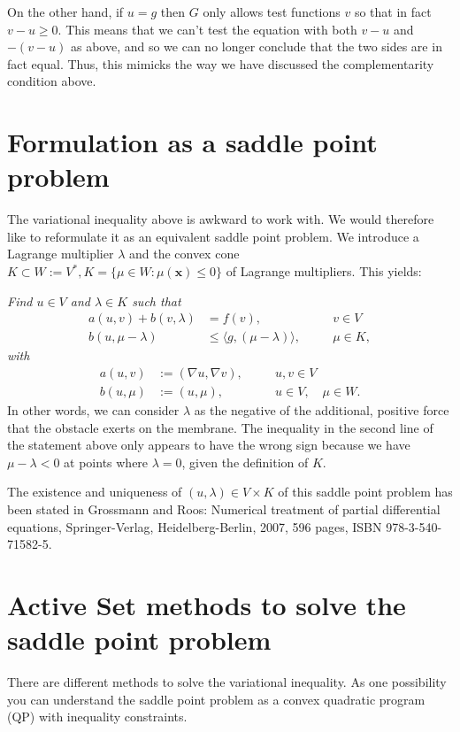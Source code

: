 \documentclass{article}
\begin{document}
On the other hand, if $u=g$ then $G$ only allows test functions $v$ so that in fact
$v-u\ge 0$. This means that we can't test the equation with both $v-u$ and
$-(v-u)$ as above, and so we can no longer conclude that the two sides are in
fact equal. Thus, this mimicks the way we have discussed the complementarity
condition above.

\section{Formulation as a saddle point problem}

The variational inequality above is awkward to work with. We would therefore
like to reformulate it as an equivalent saddle point problem. We introduce a
Lagrange multiplier $\lambda$ and the convex cone $K\subset W:=V^*, K=\{\mu\in
W: \mu(\mathbf x)\le 0\}$ of
Lagrange multipliers. This yields:

\textit{Find $u\in V$ and $\lambda\in K$ such that}
\begin{align*}
 a(u,v) + b(v,\lambda) &= f(v),\quad &&v\in V\\
 b(u,\mu - \lambda) &\leq \langle g,(\mu - \lambda)\rangle,\quad&&\mu\in K,
\end{align*}
\textit{with}
\begin{align*}
 a(u,v) &:= \left(\nabla u, \nabla v\right),\quad &&u,v\in V\\
 b(u,\mu) &:= (u,\mu),\quad &&u\in V,\quad\mu\in W.
\end{align*}
In other words, we can consider $\lambda$ as the negative of the additional, positive force that the
obstacle exerts on the membrane. The inequality in the second line of the
statement above only appears to have the wrong sign because we have
$\mu-\lambda<0$ at points where $\lambda=0$, given the definition of $K$.

The existence and uniqueness of $(u,\lambda)\in V\times K$ of this saddle
point problem has been stated in Grossmann and Roos: Numerical treatment of
partial differential equations, Springer-Verlag, Heidelberg-Berlin, 2007, 596
pages, ISBN 978-3-540-71582-5.



\section{Active Set methods to solve the saddle point problem}

There are different methods to solve the variational inequality. As one
possibility you can understand the saddle point problem as a convex quadratic program (QP) with
inequality constraints.
\end{document}
